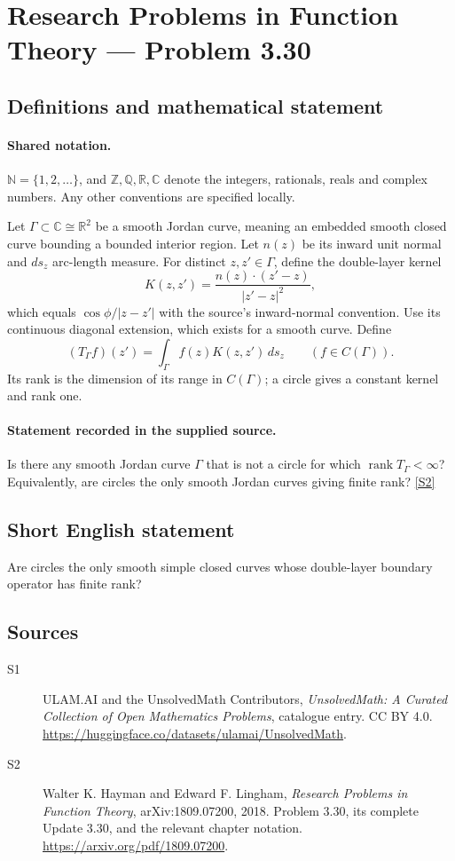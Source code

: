 \documentclass[11pt]{book}
\newcommand{\sref}[2]{\hyperlink{source:#1:#2}{[S#2]}}
\begin{document}
\section{Research Problems in Function Theory — Problem 3.30}\label{statement}

\subsection{Definitions and mathematical statement}

\paragraph{Shared notation.}$\mathbb N=\{1,2,\ldots\}$, and $\mathbb Z,\mathbb Q,\mathbb R,\mathbb C$ denote the integers, rationals, reals and complex numbers. Any other conventions are specified locally.


Let $\Gamma\subset\mathbb C\cong\mathbb R^2$ be a smooth Jordan curve, meaning an embedded smooth closed curve bounding a bounded interior region. Let $n(z)$ be its inward unit normal and $ds_z$ arc-length measure. For distinct $z,z'\in\Gamma$, define the double-layer kernel
\[K(z,z')=\frac{n(z)\cdot(z'-z)}{|z'-z|^2},\]
which equals $\cos\phi/|z-z'|$ with the source's inward-normal convention. Use its continuous diagonal extension, which exists for a smooth curve. Define
\[(T_\Gamma f)(z')=\int_\Gamma f(z)K(z,z')\,ds_z\qquad(f\in C(\Gamma)).\]
Its rank is the dimension of its range in $C(\Gamma)$; a circle gives a constant kernel and rank one.
\paragraph{Statement recorded in the supplied source.}
Is there any smooth Jordan curve $\Gamma$ that is not a circle for which $\operatorname{rank}T_\Gamma<\infty$? Equivalently, are circles the only smooth Jordan curves giving finite rank? \sref{statement}{2}
\subsection{Short English statement}
Are circles the only smooth simple closed curves whose double-layer boundary operator has finite rank?
\subsection{Sources}
\begin{description}
\item[\hypertarget{source:statement:1}{S1}] ULAM.AI and the UnsolvedMath Contributors, \emph{UnsolvedMath: A Curated Collection of Open Mathematics Problems}, catalogue entry. CC BY 4.0. \url{https://huggingface.co/datasets/ulamai/UnsolvedMath}.
\item[\hypertarget{source:statement:2}{S2}] Walter K. Hayman and Edward F. Lingham, \emph{Research Problems in Function Theory}, arXiv:1809.07200, 2018. Problem 3.30, its complete Update 3.30, and the relevant chapter notation. \url{https://arxiv.org/pdf/1809.07200}.
\end{description}
\label{end:statement}
\end{document}
